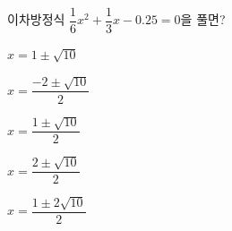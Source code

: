 이차방정식 $\dfrac{1}{6}x^2+\dfrac{1}{3}x-0.25=0$을 풀면?
\begin{choicesii}{\rule[-3ex]{0pt}{8ex}$x=1\pm\sqrt{10}$}{\rule[-3ex]{0pt}{8ex}$x=\dfrac{-2\pm\sqrt{10}}{2}$}{\rule[-3ex]{0pt}{8ex}$x=\dfrac{1\pm\sqrt{10}}{2}$}{\rule[-3ex]{0pt}{8ex}$x=\dfrac{2\pm\sqrt{10}}{2}$}{\rule[-3ex]{0pt}{8ex}$x=\dfrac{1\pm2\sqrt{10}}{2}$}\end{choicesii}
